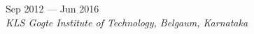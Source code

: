 
 \hfill	Sep 2012 --- Jun 2016 \\
\textit{KLS Gogte Institute of Technology, Belgaum, Karnataka}
\vspace{0.5em}
